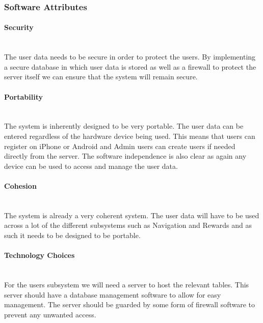 \subsubsection{Software Attributes}
\paragraph{Security}
\mbox{}\\
The user data needs to be secure in order to protect the users. By implementing a secure database in which user data is stored as well as a firewall to protect the server itself we can ensure that the system will remain secure.

\paragraph{Portability}
\mbox{}\\
The system is inherently designed to be very portable. The user data can be entered regardless of the hardware device being used. This means that users can register on iPhone or Android and Admin users can create users if needed directly from the server. The software independence is also clear as again any device can be used to access and manage the user data.

\paragraph{Cohesion}
\mbox{}\\
The system is already a very coherent system. The user data will have to be used across a lot of the different subsystems such as Navigation and Rewards and as such it needs to be designed to be portable.

\paragraph{Technology Choices}
\mbox{}\\
For the users subsystem we will need a server to host the relevant tables. This server should have a database management software to allow for easy management. The server should be 
guarded by some form of firewall software to prevent any unwanted access. 